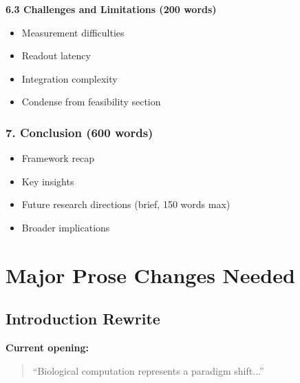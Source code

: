 \documentclass[11pt]{article}
\begin{document}
\textbf{6.3 Challenges and Limitations (200 words)}
\begin{itemize}
    \item Measurement difficulties
    \item Readout latency
    \item Integration complexity
    \item \textcolor{compress}{Condense from feasibility section}
\end{itemize}

\subsubsection{7. Conclusion (600 words)}

\begin{itemize}
    \item Framework recap
    \item Key insights
    \item Future research directions (brief, 150 words max)
    \item Broader implications
\end{itemize}

\section{Major Prose Changes Needed}

\subsection{Introduction Rewrite}

\textbf{Current opening:}
\begin{quote}
``Biological computation represents a paradigm shift...''
\end{quote}
\end{document}

